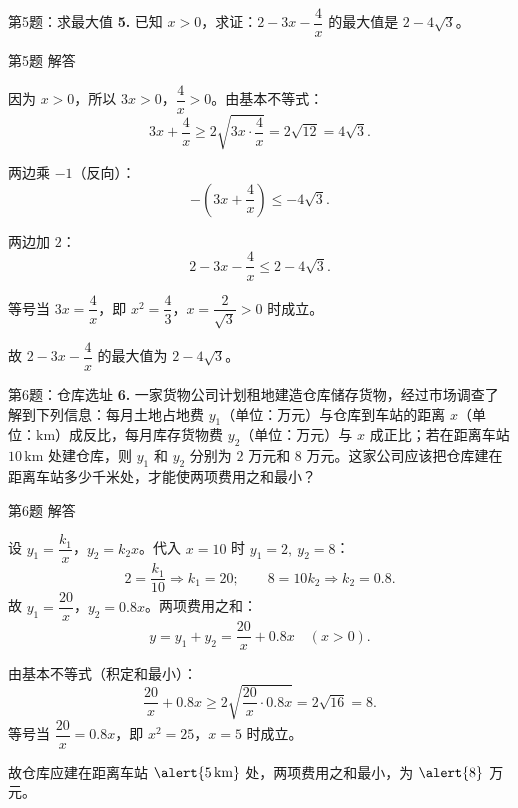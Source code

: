 \documentclass[10pt,aspectratio=169,serif]{beamer}
\begin{document}
\begin{frame}[t]{第5题：求最大值}
\textbf{5.} 已知 $x>0$，求证：$2-3x-\dfrac{4}{x}$ 的最大值是 $2-4\sqrt{3}$。
\end{frame}

\begin{frame}[t]{第5题 解答}
\begin{tcolorbox}[colback=orange!10,colframe=orange,title=\textbf{证明}]
因为 $x>0$，所以 $3x>0$，$\dfrac{4}{x}>0$。由基本不等式：
\[
3x+\frac{4}{x}\ge 2\sqrt{3x\cdot\frac{4}{x}}=2\sqrt{12}=4\sqrt{3}.
\]

两边乘 $-1$（反向）：
\[
-\left(3x+\frac{4}{x}\right)\le -4\sqrt{3}.
\]

两边加 $2$：
\[
2-3x-\frac{4}{x}\le 2-4\sqrt{3}.
\]

等号当 $3x=\dfrac{4}{x}$，即 $x^2=\dfrac{4}{3}$，$x=\dfrac{2}{\sqrt{3}}>0$ 时成立。

故 $2-3x-\dfrac{4}{x}$ 的最大值为 \alert{$2-4\sqrt{3}$}。
\end{tcolorbox}
\end{frame}

\begin{frame}[t]{第6题：仓库选址}
\textbf{6.} 一家货物公司计划租地建造仓库储存货物，经过市场调查了解到下列信息：每月土地占地费 $y_1$（单位：万元）与仓库到车站的距离 $x$（单位：$\mathrm{km}$）成反比，每月库存货物费 $y_2$（单位：万元）与 $x$ 成正比；若在距离车站 $10\,\mathrm{km}$ 处建仓库，则 $y_1$ 和 $y_2$ 分别为 $2$ 万元和 $8$ 万元。这家公司应该把仓库建在距离车站多少千米处，才能使两项费用之和最小？
\end{frame}

\begin{frame}[t]{第6题 解答}
\begin{tcolorbox}[colback=orange!10,colframe=orange,title=\textbf{解}]
设 $y_1=\dfrac{k_1}{x}$，$y_2=k_2 x$。代入 $x=10$ 时 $y_1=2,\ y_2=8$：
\[
2=\frac{k_1}{10}\Rightarrow k_1=20;\qquad 8=10k_2\Rightarrow k_2=0.8.
\]
故 $y_1=\dfrac{20}{x}$，$y_2=0.8x$。两项费用之和：
\[
y=y_1+y_2=\frac{20}{x}+0.8x\quad (x>0).
\]

由基本不等式（积定和最小）：
\[
\frac{20}{x}+0.8x\ge 2\sqrt{\frac{20}{x}\cdot 0.8x}=2\sqrt{16}=8.
\]
等号当 $\dfrac{20}{x}=0.8x$，即 $x^2=25$，$x=5$ 时成立。

\vspace{0.3em}
故仓库应建在距离车站 $\alert{5\,\mathrm{km}}$ 处，两项费用之和最小，为 $\alert{8}$ 万元。
\end{tcolorbox}
\end{frame}
\end{document}
